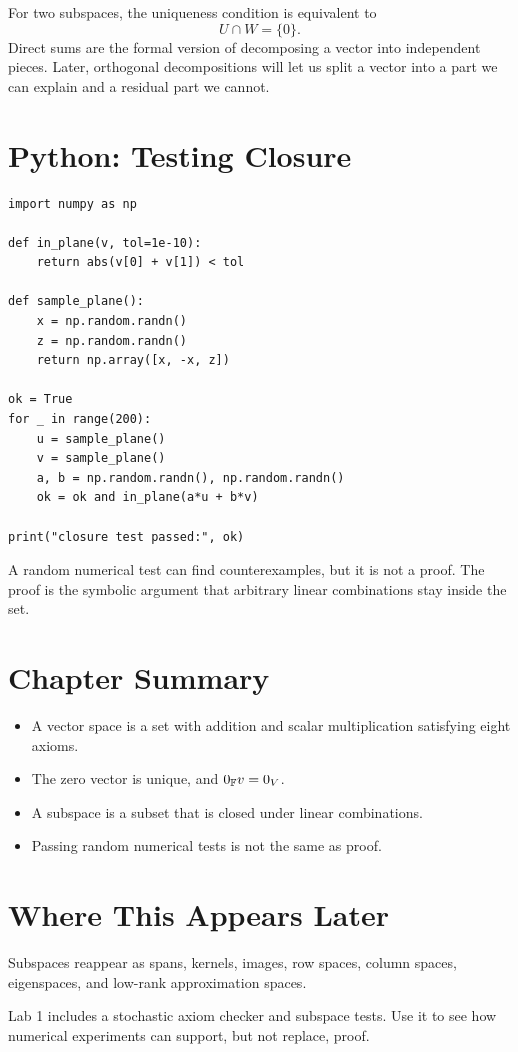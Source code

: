 For two subspaces, the uniqueness condition is equivalent to
\[
  U\cap W=\{0\}.
\]
Direct sums are the formal version of decomposing a vector into independent
pieces. Later, orthogonal decompositions will let us split a vector into a
part we can explain and a residual part we cannot.

\section{Python: Testing Closure}

\begin{lstlisting}
import numpy as np

def in_plane(v, tol=1e-10):
    return abs(v[0] + v[1]) < tol

def sample_plane():
    x = np.random.randn()
    z = np.random.randn()
    return np.array([x, -x, z])

ok = True
for _ in range(200):
    u = sample_plane()
    v = sample_plane()
    a, b = np.random.randn(), np.random.randn()
    ok = ok and in_plane(a*u + b*v)

print("closure test passed:", ok)
\end{lstlisting}

\begin{warningbox}
A random numerical test can find counterexamples, but it is not a proof. The
proof is the symbolic argument that arbitrary linear combinations stay inside
the set.
\end{warningbox}

\section*{Chapter Summary}

\begin{itemize}
  \item A vector space is a set with addition and scalar multiplication
    satisfying eight axioms.
  \item The zero vector is unique, and $0_{\mathbb{F}}v=0_V$.
  \item A subspace is a subset that is closed under linear combinations.
  \item Passing random numerical tests is not the same as proof.
\end{itemize}

\section*{Where This Appears Later}

Subspaces reappear as spans, kernels, images, row spaces, column spaces,
eigenspaces, and low-rank approximation spaces.

\begin{labbox}
Lab 1 includes a stochastic axiom checker and subspace tests. Use it to see
how numerical experiments can support, but not replace, proof.
\end{labbox}


